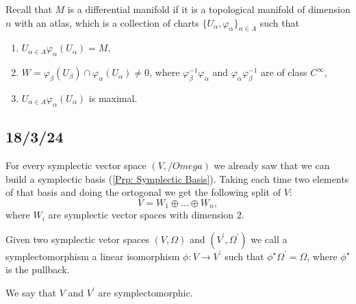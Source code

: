 \begin{Rmk}\label{Rmk: Differentiable manifold}
    Recall that $M$ is a differential manifold if it is a topological manifold of dimension $n$ with an atlas, which is a collection of charts $\{U_\alpha,\varphi_\alpha\}_{\alpha\in A}$ such that
    \begin{enumerate}[label=\RmkLbl]

        \item $U_{\alpha\in A} \varphi_\alpha(U_\alpha) = M$,

        \item $W = \varphi_\beta(U_\beta)\cap\varphi_\alpha(U_\alpha)\neq 0$, where $\varphi_\beta^{-1}\varphi_\alpha$ and $\varphi_\alpha\varphi_\beta^{-1}$ are of class $C^\infty$,

        \item $U_{\alpha\in A} \varphi_\alpha(U_\alpha)$ is maximal.
    \end{enumerate}
\end{Rmk}

\begin{Exp}\label{Exp: Differentiable manifolds}
\end{Exp}

\subsection*{18/3/24}\label{Sec: 18/3/24}


\begin{Rmk}
    For every symplectic vector space $(V,/Omega)$ we already saw that we can build a symplectic basis (\ref{Prp: Symplectic Basis}). Taking each time two elements of that basis and doing the ortogonal we get the following split of $V$:
    \[
        V=W_1 \oplus \dots \oplus W_n,
    \]
    where $W_i$ are symplectic vector spaces with dimension $2$.
\end{Rmk}

\begin{Dfn}
    Given two symplectic vetor spaces $(V,\Omega)$ and $(V^\prime,\Omega^\prime)$ we call a symplectomorphism a linear isomorphism $\phi: V \rightarrow V^\prime$ such that $\phi^\star\Omega^\prime=\Omega$, where $\phi^\star$ is the pullback.

    We say that $V$ and $V^\prime$ are symplectomorphic.
\end{Dfn}

